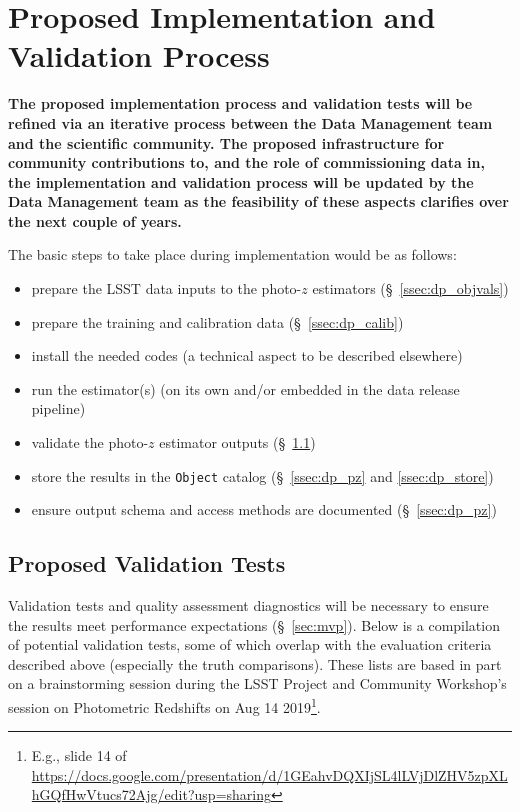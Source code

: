 \documentclass[DM,lsstdraft,toc]{lsstdoc}
\begin{document}
\clearpage
\section{Proposed Implementation and Validation Process}\label{sec:imp}

\textbf{The proposed implementation process and validation tests will be refined via an iterative process between the Data Management team and the scientific community. The proposed infrastructure for community contributions to, and the role of commissioning data in, the implementation and validation process will be updated by the Data Management team as the feasibility of these aspects clarifies over the next couple of years.}

The basic steps to take place during implementation would be as follows:
\vspace{-15pt}
\begin{itemize}
\item prepare the LSST data inputs to the photo-$z$ estimators (\S~\ref{ssec:dp_objvals})
\item prepare the training and calibration data (\S~\ref{ssec:dp_calib})
\item install the needed codes (a technical aspect to be described elsewhere)
\item run the estimator(s) (on its own and/or embedded in the data release pipeline)
\item validate the photo-$z$ estimator outputs (\S~\ref{ssec:imp_val})
\item store the results in the {\tt Object} catalog (\S~\ref{ssec:dp_pz} and \ref{ssec:dp_store})
\item ensure output schema and access methods are documented (\S~\ref{ssec:dp_pz})
\end{itemize}

\subsection{Proposed Validation Tests}\label{ssec:imp_val}

Validation tests and quality assessment diagnostics will be necessary to ensure the results meet performance expectations (\S~\ref{sec:mvp}).
Below is a compilation of potential validation tests, some of which overlap with the evaluation criteria described above (especially the truth comparisons). 
These lists are based in part on a brainstorming session during the LSST Project and Community Workshop's session on Photometric Redshifts on Aug 14 2019\footnote{E.g., slide 14 of \url{https://docs.google.com/presentation/d/1GEahvDQXIjSL4lLVjDlZHV5zpXLhGQfHwVtucs72Ajg/edit?usp=sharing}}.
\end{document}
